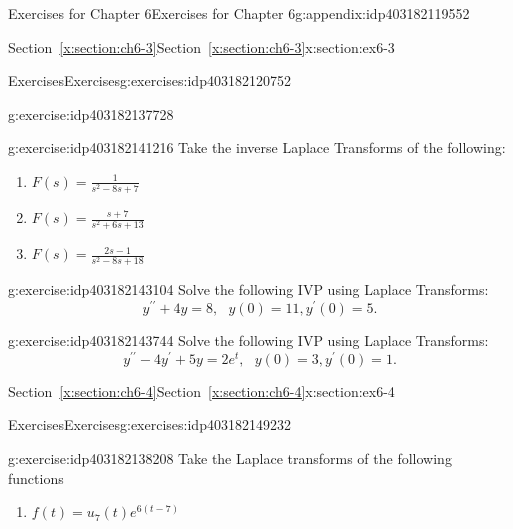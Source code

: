 \documentclass[oneside,10pt,]{book}
\newcommand{\xreffont}{\relax}
\numberwithin{equation}{section}
\numberwithin{equation}{section}
\begin{document}
\begin{appendixptx}{Exercises for Chapter 6}{}{Exercises for Chapter 6}{}{}{g:appendix:idp403182119552}
\begin{sectionptx}{Section~{\xreffont\ref*{x:section:ch6-3}}}{}{Section~{\xreffont\ref*{x:section:ch6-3}}}{}{}{x:section:ex6-3}
\begin{exercises-subsection-numberless}{Exercises}{}{Exercises}{}{}{g:exercises:idp403182120752}
\begin{divisionexercise}{1}{}{}{g:exercise:idp403182137728}
\begin{enumerate}[label=(\alph*)]
\end{enumerate}
%
\end{divisionexercise}%
\begin{divisionexercise}{2}{}{}{g:exercise:idp403182141216}%
Take the inverse Laplace Transforms of the following:%
\begin{enumerate}[label=(\alph*)]
\item{}\(\displaystyle F(s)=\frac{1}{s^{2}-8s+7}\)%
\item{}\(\displaystyle F(s)=\frac{s+7}{s^{2}+6s+13}\)%
\item{}\(\displaystyle F(s)=\frac{2s-1}{s^{2}-8s+18}\)%
\end{enumerate}
%
\end{divisionexercise}%
\begin{divisionexercise}{3}{}{}{g:exercise:idp403182143104}%
Solve the following IVP using Laplace Transforms:%
\begin{equation*}
y^{\prime\prime}+4y=8,\,\,\,\,y(0)=11,y^{\prime}(0)=5.
\end{equation*}
%
\end{divisionexercise}%
\begin{divisionexercise}{4}{}{}{g:exercise:idp403182143744}%
Solve the following IVP using Laplace Transforms:%
\begin{equation*}
y^{\prime\prime}-4y^{\prime}+5y=2e^{t},\,\,\,\,y(0)=3,y^{\prime}(0)=1.
\end{equation*}
%
\end{divisionexercise}%
\end{exercises-subsection-numberless}
\end{sectionptx}
%
%
\typeout{************************************************}
\typeout{Section F.4 Section~{\xreffont\ref*{x:section:ch6-4}}}
\typeout{************************************************}
%
\begin{sectionptx}{Section~{\xreffont\ref*{x:section:ch6-4}}}{}{Section~{\xreffont\ref*{x:section:ch6-4}}}{}{}{x:section:ex6-4}
%
%
\typeout{************************************************}
\typeout{************************************************}
%
\begin{exercises-subsection-numberless}{Exercises}{}{Exercises}{}{}{g:exercises:idp403182149232}
\begin{divisionexercise}{1}{}{}{g:exercise:idp403182138208}%
Take the Laplace transforms of the following functions%
\begin{enumerate}[label=(\alph*)]
\item{}\(\displaystyle f(t)=u_{7}(t)e^{6\left(t-7\right)}\)%

\end{enumerate}
\end{divisionexercise}
\end{exercises-subsection-numberless}
\end{sectionptx}
\end{appendixptx}
\end{document}
